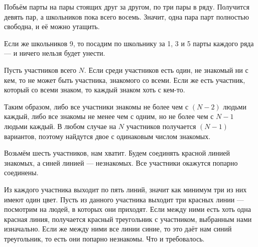 \begin{itemize}

\itA Побьём парты на пары стоящих друг за другом, по три пары в ряду. Получится девять пар, а школьников пока всего восемь. Значит, одна пара парт полностью свободна, и её можно утащить.

Если же школьников 9, то посадим по школьнику за 1, 3 и 5 парты каждого ряда — и ничего нельзя будет унести.

\itB Пусть участников всего $N$. Если среди участников есть один, не знакомый ни с кем, то не может быть участника, знакомого со всеми. Если же есть участник, который со всеми знаком, то каждый знаком хоть с кем-то.

Таким образом, либо все участники знакомы не более чем с $(N-2)$ людьми каждый, либо все знакомы не менее чем с одним, но не более чем с $N-1$ людьми каждый. В любом случае на $N$ участников получается $(N-1)$ вариантов, поэтому найдутся двое с одинаковым числом знакомых.

\itC Возьмём шесть участников, нам хватит. Будем соединять красной линией знакомых, а синей линией — незнакомых. Все участники окажутся попарно соединены.

Из каждого участника выходит по пять линий, значит как минимум три из них имеют один цвет. Пусть из данного участника выходит три красных линии — посмотрим на людей, в которых они приходят. Если между ними есть хоть одна красная линия, получается красный треугольник с участником, выбранным нами изначально. Если же между ними все линии синие, то это даёт нам синий треугольник, то есть они попарно незнакомы. Что и требовалось.

\end{itemize}
